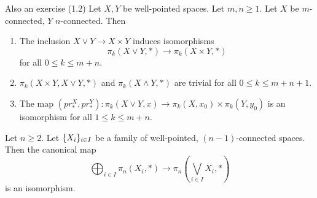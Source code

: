 \documentclass[language=english]{TemplateLecture}
\begin{document}
\begin{proposition}
    Also an exercise (1.2) Let \(X,Y\) be well-pointed spaces. Let \(m,n \geq 1\). Let \(X\) be \(m\)-connected, \(Y\) \(n\)-connected. Then
    \begin{enumerate}
        \item The inclusion \(X\vee Y\to X\times Y\) induces isomorphisms
        \[\pi_k(X\vee Y, *) \to \pi_k(X\times Y, *)\]
        for all \(0 \leq k \leq m+n\).
        \item \(\pi_k(X\times Y, X\vee Y, *)\) and \(\pi_k(X\wedge Y, *)\) are trivial for all \(0 \leq k\leq m+n+1\).
        \item The map \((pr_*^X, pr_*^Y)\colon \pi_k(X\vee Y, x) \to \pi_k(X, x_0)\times \pi_k(Y, y_0)\) is an isomorphism for all \(1 \leq k \leq m+n\).
    \end{enumerate}
\end{proposition}


\begin{proposition}
    Let \(n \geq 2\). Let \(\{X_i\}_{i\in I}\) be a family of well-pointed, \((n-1)\)-connected spaces. Then the canonical map
    \[\bigoplus_{i\in I} \pi_n(X_i, *) \to \pi_n(\bigvee_{i\in I} X_i, *)\]
    is an isomorphism.
\end{proposition}
\end{document}
